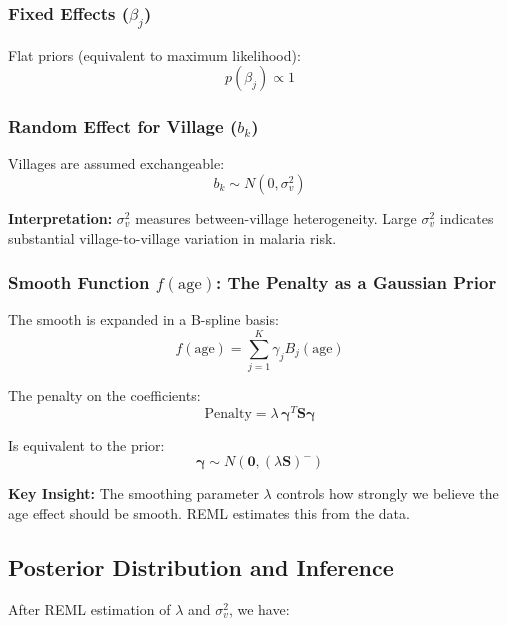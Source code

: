 \documentclass[12pt]{article}
\begin{document}
\subsubsection{Fixed Effects ($\beta_j$)}
Flat priors (equivalent to maximum likelihood):
\begin{equation*}
    p(\beta_j) \propto 1
\end{equation*}

\subsubsection{Random Effect for Village ($b_k$)}
Villages are assumed exchangeable:
\begin{equation*}
    b_k \sim N(0, \sigma^2_v)
\end{equation*}

\textbf{Interpretation:} $\sigma^2_v$ measures between-village heterogeneity. Large $\sigma^2_v$ indicates substantial village-to-village variation in malaria risk.

\subsubsection{Smooth Function $f(\text{age})$: The Penalty as a Gaussian Prior}
The smooth is expanded in a B-spline basis:
\begin{equation*}
f(\text{age}) = \sum_{j=1}^{K} \gamma_j B_j(\text{age})
\end{equation*}

The penalty on the coefficients:
\begin{equation*}
    \text{Penalty} = \lambda \, \boldsymbol{\gamma}^T \mathbf{S} \boldsymbol{\gamma}
\end{equation*}

Is equivalent to the prior:
\begin{equation*}
    \boldsymbol{\gamma} \sim N(\mathbf{0}, (\lambda \mathbf{S})^{-})
\end{equation*}

\textbf{Key Insight:} The smoothing parameter $\lambda$ controls how strongly we believe the age effect should be smooth. REML estimates this from the data.

\subsection{Posterior Distribution and Inference}

After REML estimation of $\lambda$ and $\sigma_v^2$, we have:
\end{document}
